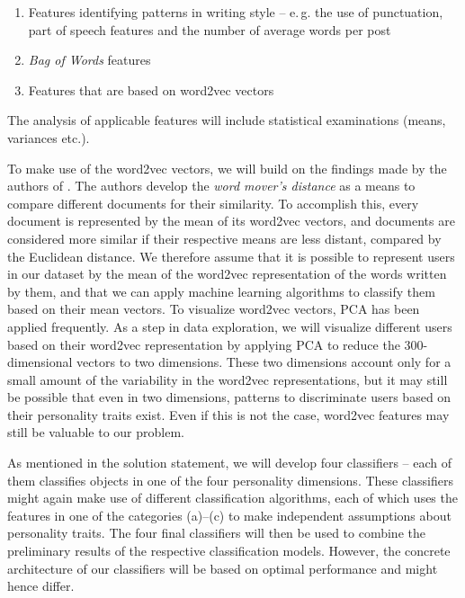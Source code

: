 \documentclass[12pt]{elsarticle}
\begin{document}
\begin{enumerate}[label=(\alph*)]
\item Features identifying patterns in writing style -- e.\,g. the use of punctuation, part of speech features and the number of average words per post
\item \textit{Bag of Words} features
\item Features that are based on word2vec vectors
\end{enumerate}

The analysis of applicable features will include statistical examinations (means, variances etc.). 




To make use of the word2vec vectors, we will build on the findings made by the authors of \cite{wmd}. The authors develop the \textit{word mover's distance} as a means to compare different documents for their similarity. To accomplish this, every document is represented by the mean of its word2vec vectors, and documents are considered more similar if their respective means are less distant, compared by the Euclidean distance. We therefore assume that it is possible to represent users in our dataset by the mean of the word2vec representation of the words written by them, and that we can apply machine learning algorithms to classify them based on their mean vectors. To visualize word2vec vectors, PCA has been applied frequently. As a step in data exploration, we will visualize different users based on their word2vec representation by applying PCA to reduce the 300-dimensional vectors to two dimensions. These two dimensions account only for a small amount of the variability in the word2vec representations, but it may still be possible that even in two dimensions, patterns to discriminate users based on their personality traits exist. Even if this is not the case, word2vec features may still be valuable to our problem. 


As mentioned in the solution statement, we will develop four classifiers -- each of them classifies objects in one of the four personality dimensions. These classifiers might again make use of different classification algorithms, each of which uses the features in one of the categories (a)--(c) to make independent assumptions about personality traits. The four final classifiers will then be used to combine the preliminary results of the respective classification models. However, the concrete architecture of our classifiers will be based on optimal performance and might hence differ.
\end{document}
